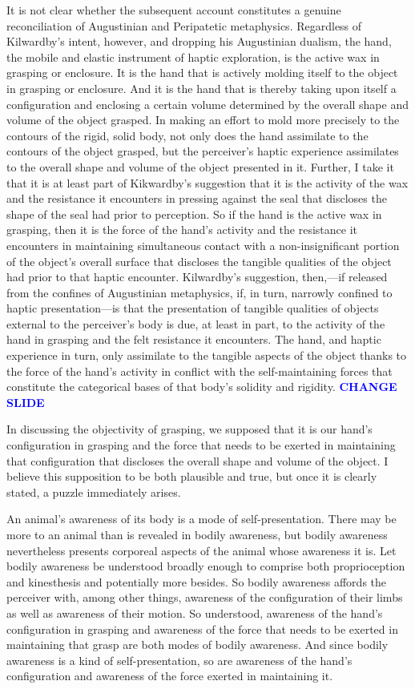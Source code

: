 \documentclass[12pt]{article}
\newcommand{\change}{\textcolor{blue}{\textbf{CHANGE SLIDE}}}
\begin{document}
It is not clear whether the subsequent account constitutes a genuine reconciliation of Augustinian and Peripatetic metaphysics. Regardless of Kilwardby's intent, however, and dropping his Augustinian dualism, the hand, the mobile and elastic instrument of haptic exploration, is the active wax in grasping or enclosure. It is the hand that is actively molding itself to the object in grasping or enclosure. And it is the hand that is thereby taking upon itself a configuration and enclosing a certain volume determined by the overall shape and volume of the object grasped. In making an effort to mold more precisely to the contours of the rigid, solid body, not only does the hand assimilate to the contours of the object grasped, but the perceiver's haptic experience assimilates to the overall shape and volume of the object presented in it. Further, I take it that it is at least part of Kikwardby's suggestion that it is the activity of the wax and the resistance it encounters in pressing against the seal that discloses the shape of the seal had prior to perception. So if the hand is the active wax in grasping, then it is the force of the hand's activity and the resistance it encounters in maintaining simultaneous contact with a non-insignificant portion of the object's overall surface that discloses the tangible qualities of the object had prior to that haptic encounter. Kilwardby's suggestion, then,---if released from the confines of Augustinian metaphysics, if, in turn, narrowly confined to haptic presentation---is that the presentation of tangible qualities of objects external to the perceiver's body is due, at least in part, to the activity of the hand in grasping and the felt resistance it encounters. The hand, and haptic experience in turn, only assimilate to the tangible aspects of the object thanks to the force of the hand's activity in conflict with the self-maintaining forces that constitute the categorical bases of that body's solidity and rigidity. \change

In discussing the objectivity of grasping, we supposed that it is our hand's configuration in grasping and the force that needs to be exerted in maintaining that configuration that discloses the overall shape and volume of the object. I believe this supposition to be both plausible and true, but once it is clearly stated, a puzzle immediately arises. 

An animal's awareness of its body is a mode of self-presentation. There may be more to an animal than is revealed in bodily awareness, but bodily awareness nevertheless presents corporeal aspects of the animal whose awareness it is. Let bodily awareness be understood broadly enough to comprise both proprioception and kinesthesis and potentially more besides. So bodily awareness affords the perceiver with, among other things, awareness of the configuration of their limbs as well as awareness of their motion. So understood, awareness of the hand's configuration in grasping and awareness of the force that needs to be exerted in maintaining that grasp are both modes of bodily awareness. And since bodily awareness is a kind of self-presentation, so are awareness of the hand's configuration and awareness of the force exerted in maintaining it. 
\end{document}
